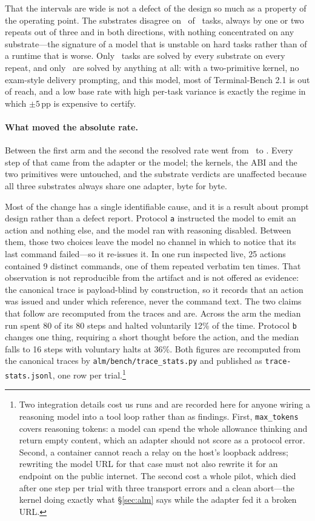 \documentclass[11pt,a4paper]{article}
\begin{document}
That the intervals are wide is not a defect of the design so much as a
property of the operating point. The substrates disagree on \tbdisagree\ of
\tbtasks\ tasks, always by one or two repeats out of three and in both
directions, with nothing concentrated on any substrate---the signature of a
model that is unstable on hard tasks rather than of a runtime that is worse.
Only \tbeveryone\ tasks are solved by every substrate on every repeat, and only
\tbsomeone\ are solved by anything at all: with a two-primitive kernel, no
exam-style delivery prompting, and this model, most of Terminal-Bench 2.1 is
out of reach, and a low base rate with high per-task variance is exactly the
regime in which $\pm5$\,pp is expensive to certify.

\paragraph{What moved the absolute rate.}
Between the first arm and the second the resolved rate went from \tbarmone\ to
\tbarmtwo. Every step of that came from the adapter or the model; the kernels,
the ABI and the two primitives were untouched, and the substrate verdicts are
unaffected because all three substrates always share one adapter, byte for
byte.

Most of the change has a single identifiable cause, and it is a result about
prompt design rather than a defect report. Protocol \texttt{a} instructed the
model to emit an action and nothing else, and the model ran with reasoning
disabled. Between them, those two choices leave the model no channel in which
to notice that its last command failed---so it re-issues it. In one run inspected live, 25 actions contained 9 distinct commands, one
of them repeated verbatim ten times. That observation is not reproducible
from the artifact and is not offered as evidence: the canonical trace is
payload-blind by construction, so it records that an action was issued and
under which reference, never the command text. The two claims that follow
are recomputed from the traces and are. Across the arm the median run spent 80 of its 80 steps and halted
voluntarily 12\% of the time. Protocol \texttt{b} changes one thing, requiring
a short thought before the action, and the median falls to 16 steps with
voluntary halts at 36\%. Both figures are recomputed from the canonical
traces by \texttt{alm/bench/trace\_stats.py} and published as
\texttt{trace-stats.jsonl}, one row per trial.\footnote{Two integration details cost us runs and are
recorded here for anyone wiring a reasoning model into a tool loop rather than
as findings. First, \texttt{max\_tokens} covers reasoning tokens: a model can
spend the whole allowance thinking and return empty content, which an adapter
should not score as a protocol error. Second, a container cannot reach a relay
on the host's loopback address; rewriting the model URL for that case must not
also rewrite it for an endpoint on the public internet. The second cost a whole
pilot, which died after one step per trial with three transport errors and a
clean abort---the kernel doing exactly what \S\ref{sec:alm} says while the
adapter fed it a broken URL.}
\end{document}
